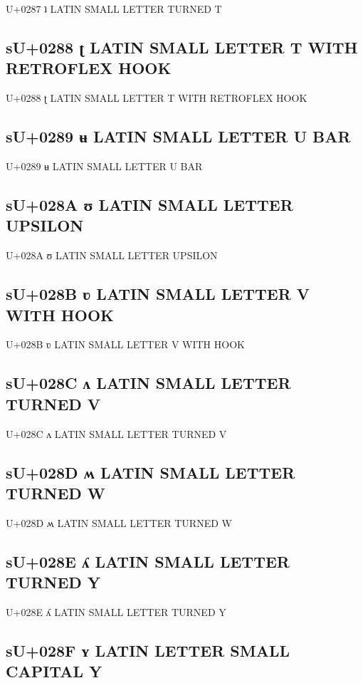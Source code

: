 U+0287 ʇ LATIN SMALL LETTER TURNED T

\subsection{sU+0288 ʈ LATIN SMALL LETTER T WITH RETROFLEX HOOK}

U+0288 ʈ LATIN SMALL LETTER T WITH RETROFLEX HOOK

\subsection{sU+0289 ʉ LATIN SMALL LETTER U BAR}

U+0289 ʉ LATIN SMALL LETTER U BAR

\subsection{sU+028A ʊ LATIN SMALL LETTER UPSILON}

U+028A ʊ LATIN SMALL LETTER UPSILON

\subsection{sU+028B ʋ LATIN SMALL LETTER V WITH HOOK}

U+028B ʋ LATIN SMALL LETTER V WITH HOOK

\subsection{sU+028C ʌ LATIN SMALL LETTER TURNED V}

U+028C ʌ LATIN SMALL LETTER TURNED V

\subsection{sU+028D ʍ LATIN SMALL LETTER TURNED W}

U+028D ʍ LATIN SMALL LETTER TURNED W

\subsection{sU+028E ʎ LATIN SMALL LETTER TURNED Y}

U+028E ʎ LATIN SMALL LETTER TURNED Y

\subsection{sU+028F ʏ LATIN LETTER SMALL CAPITAL Y}

